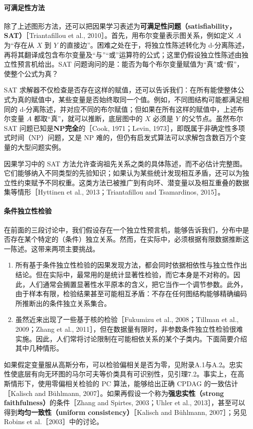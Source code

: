\paragraph{可满足性方法}
除了上述图形方法，还可以把因果学习表述为\textbf{可满足性问题（satisfiability，SAT）}［Triantafillou et al., 2010］。首先，用布尔变量表示图关系，例如定义 $A$ 为“存在从 $X$ 到 $Y$ 的直接边”。困难之处在于，将独立性陈述转化为 d-分离陈述，再将其翻译成包含布尔变量及“与”“或”运算符的公式；这里仍假设独立性陈述由独立性预言机给出。SAT 问题询问的是：能否为每个布尔变量赋值为“真”或“假”，使整个公式为真？

SAT 求解器不仅检查是否存在这样的赋值，还可以告诉我们：在所有能使整体公式为真的赋值中，某些变量是否始终取同一个值。例如，不同图结构可能都满足相同的 d-分离陈述，并对应不同的布尔赋值；但如果在所有这样的赋值中，上述布尔变量 $A$ 都取“真”，就可以推断，底层图中的 $X$ 必须是 $Y$ 的父节点。虽然布尔 SAT 问题已知是\textbf{NP完全}的［Cook, 1971；Levin, 1973］，即既属于非确定性多项式时间（NP）问题，又是 NP 难的，但仍有启发式算法可以求解包含数百万个变量的大型问题实例。

因果学习中的 SAT 方法允许查询祖先关系之类的具体陈述，而不必估计完整图。它们能够纳入不同类型的先验知识；如果认为某些统计发现相互矛盾，还可以为独立性约束赋予不同权重。这类方法已被推广到有向环、潜变量以及相互重叠的数据集等情形［Hyttinen et al., 2013；Triantafillou and Tsamardinos, 2015］。

\paragraph{条件独立性检验}
在前面的三段讨论中，我们假设存在一个独立性预言机，能够告诉我们，分布中是否存在某个特定的（条件）独立关系。然而，在实际中，必须根据有限数据推断这一陈述。这带来两项主要挑战。
\begin{enumerate}[label=(\arabic*)]
 \item 所有基于条件独立性检验的因果发现方法，都会同时依据相依性与独立性作出结论。但在实际中，最常用的是统计显著性检验，而它本身是不对称的。因此，人们通常会搁置显著性水平原本的含义，把它当作一个调节参数。此外，由于样本有限，检验结果甚至可能相互矛盾：不存在任何图结构能够精确编码所推断出的条件独立关系集合。
 \item 虽然近来出现了一些基于核的检验［Fukumizu et al., 2008；Tillman et al., 2009；Zhang et al., 2011］，但在数据量有限时，非参数条件独立性检验很难实施。因此，人们常将讨论限制在可能相依关系的某个子类内。下面简要介绍其中几种情形。
\end{enumerate}

如果假定变量服从高斯分布，可以检验偏相关是否为零，见附录A.1与A.2。忠实性使底层有向无环图的马尔可夫等价类具有可识别性，见引理7.2。事实上，在高斯情形下，使用零偏相关检验的 PC 算法，能够给出正确 CPDAG 的一致估计［Kalisch and Bühlmann, 2007］。如果再假设一个称为\textbf{强忠实性（strong faithfulness）}的条件［Zhang and Spirtes, 2003；Uhler et al., 2013］，甚至可以得到\textbf{均匀一致性（uniform consistency）}［Kalisch and Bühlmann, 2007］；另见 Robins et al.［2003］中的讨论。

